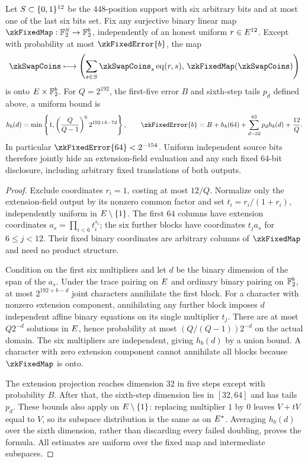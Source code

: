 \begin{theorem}\label{thm:fixed-observation-span}
Let $S\subset\{0,1\}^{12}$ be the $448$-position support with six arbitrary bits and at most one of the last six bits set. Fix any surjective binary linear map $\zkFixedMap:\Ftwo^S\to\Ftwo^b$, independently of an honest uniform $r\in E^{12}$. Except with probability at most $\zkFixedError{b}$, the map
\[
 \zkSwapCoins\longmapsto
 \left(\sum_{s\in S}\zkSwapCoins_s\eq(r,s),\,
       \zkFixedMap(\zkSwapCoins)\right)
\]
is onto $E\times\mathbb{F}_2^b$. For $Q=2^{192}$, the first-five error $B$ and sixth-step tails $p_d$ defined above, a uniform bound is
\[
 h_b(d)=\min\left\{1,\left(\frac Q{Q-1}\right)^6 2^{192+b-7d}\right\},
 \qquad
 \zkFixedError{b}=B+h_b(64)+\sum_{d=32}^{63}p_dh_b(d)+\frac{12}{Q}.
\]
In particular $\zkFixedError{64}<2^{-154}$. Uniform independent source bits therefore jointly hide an extension-field evaluation and any such fixed $64$-bit disclosure, including arbitrary fixed translations of both outputs.
\end{theorem}
\begin{proof}
Exclude coordinates $r_i=1$, costing at most $12/Q$. Normalize only the extension-field output by its nonzero common factor and set $t_i=r_i/(1+r_i)$, independently uniform in $E\setminus\{1\}$. The first $64$ columns have extension coordinates $a_s=\prod_{i<6}t_i^{s_i}$; the six further blocks have coordinates $t_j a_s$ for $6\le j<12$. Their fixed binary coordinates are arbitrary columns of $\zkFixedMap$ and need no product structure.

Condition on the first six multipliers and let $d$ be the binary dimension of the span of the $a_s$. Under the trace pairing on $E$ and ordinary binary pairing on $\mathbb{F}_2^b$, at most $2^{192+b-d}$ joint characters annihilate the first block. For a character with nonzero extension component, annihilating any further block imposes $d$ independent affine binary equations on its single multiplier $t_j$. There are at most $Q2^{-d}$ solutions in $E$, hence probability at most $(Q/(Q-1))2^{-d}$ on the actual domain. The six multipliers are independent, giving $h_b(d)$ by a union bound. A character with zero extension component cannot annihilate all blocks because $\zkFixedMap$ is onto.

The extension projection reaches dimension $32$ in five steps except with probability $B$. After that, the sixth-step dimension lies in $[32,64]$ and has tails $p_d$. These bounds also apply on $E\setminus\{1\}$: replacing multiplier $1$ by $0$ leaves $V+tV$ equal to $V$, so its subspace distribution is the same as on $E^*$. Averaging $h_b(d)$ over the sixth dimension, rather than discarding every failed doubling, proves the formula. All estimates are uniform over the fixed map and intermediate subspaces.
\end{proof}

